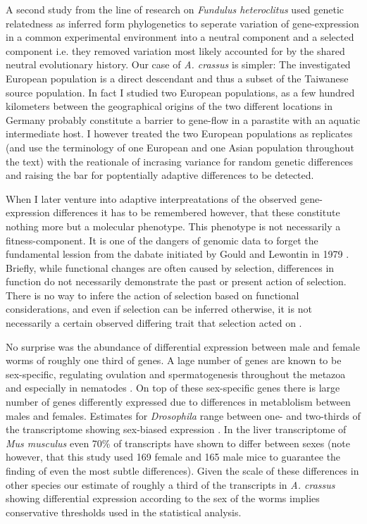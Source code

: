 A second study from the line of research on \textit{Fundulus
  heteroclitus} \cite{pmid16567645} used genetic relatedness as
inferred form phylogenetics to seperate variation of gene-expression
in a common experimental environment into a neutral component and a
selected component i.e. they removed variation most likely accounted
for by the shared neutral evolutionary history. Our case of
\textit{A. crassus} is simpler: The investigated European population
is a direct descendant and thus a subset of the Taiwanese source
population. In fact I studied two European populations, as a few
hundred kilometers between the geographical origins of the two
different locations in Germany probably constitute a barrier to
gene-flow in a parastite with an aquatic intermediate host. I however
treated the two European populations as replicates (and use the
terminology of one European and one Asian population throughout the
text) with the reationale of incrasing variance for random genetic
differences and raising the bar for poptentially adaptive differences
to be detected.

When I later venture into adaptive interpreatations of the observed
gene-expression differences it has to be remembered however, that
these constitute nothing more but a molecular phenotype. This
phenotype is not necessarily a fitness-component. It is one of the
dangers of genomic data to forget the fundamental lession from the
dabate initiated by Gould and Lewontin in 1979
\cite{gould_spandrels_1979}. Briefly, while functional changes are
often caused by selection, differences in function do not necessarily
demonstrate the past or present action of selection. There is no way
to infere the action of selection based on functional considerations,
and even if selection can be inferred otherwise, it is not necessarily
a certain observed differing trait that selection acted on
\cite{pmid19744124}.

No surprise was the abundance of differential expression between male
and female worms of roughly one third of genes. A lage number of genes
are known to be sex-specific, regulating ovulation and spermatogenesis
throughout the metazoa and especially in nematodes
\cite{pmid15371532}. On top of these sex-specific genes there is large
number of genes differently expressed due to differences in
metablolism between males and females. Estimates for
\textit{Drosophila} range between one- and two-thirds of the
transcriptome showing sex-biased expression \cite{pmid11726925}. In
the liver transcriptome of \textit{Mus musculus} even 70\% of
transcripts have shown to differ between sexes \cite{pmid16825664}
(note however, that this study used 169 female and 165 male mice to
guarantee the finding of even the most subtle differences). Given the
scale of these differences in other species our estimate of roughly a
third of the transcripts in \textit{A. crassus} showing differential
expression according to the sex of the worms implies conservative
thresholds used in the statistical analysis.

